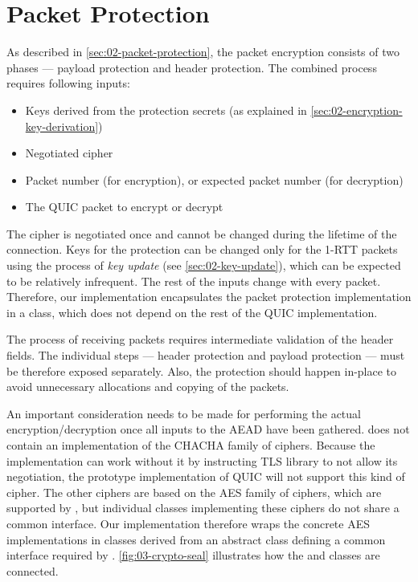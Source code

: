 \section{Packet Protection}

As described in \autoref{sec:02-packet-protection}, the packet encryption consists of two phases ---
payload protection and header protection. The combined process requires following inputs:

\begin{itemize}

  \item Keys derived from the protection secrets (as explained in
  \autoref{sec:02-encryption-key-derivation})

  \item Negotiated cipher

  \item Packet number (for encryption), or expected packet number (for decryption)

  \item The QUIC packet to encrypt or decrypt

\end{itemize}

The cipher is negotiated once and cannot be changed during the lifetime of the connection. Keys for
the protection can be changed only for the 1-RTT packets using the process of \textit{key update}
(see \autoref{sec:02-key-update}), which can be expected to be relatively infrequent. The rest of
the inputs change with every packet. Therefore, our implementation encapsulates the packet
protection implementation in a  class, which does not depend on the rest of the
QUIC implementation.

The process of receiving packets requires intermediate validation of the header fields. The
individual steps --- header protection and payload protection --- must be therefore exposed separately.
Also, the protection should happen in-place to avoid unnecessary allocations and copying of the
packets.

An important consideration needs to be made for performing the actual encryption/decryption once all
inputs to the AEAD have been gathered. \dotnet{} does not contain an implementation of the CHACHA
family of ciphers. Because the implementation can work without it by instructing TLS library to not
allow its negotiation, the prototype implementation of QUIC will not support this kind of cipher.
The other ciphers are based on the AES family of ciphers, which are supported by \dotnet{}, but
individual classes implementing these ciphers do not share a common interface. Our implementation
therefore wraps the concrete AES implementations in classes derived from an abstract
 class defining a common interface required by \CryptoSeal{}.
\autoref{fig:03-crypto-seal} illustrates how the \CryptoSeal{} and 
classes are connected.

